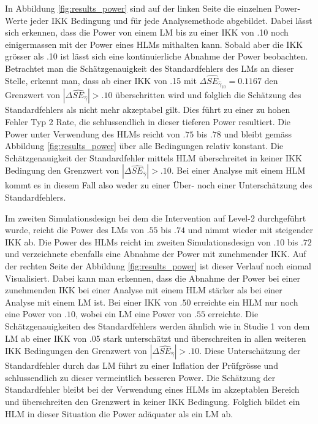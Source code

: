 \documentclass[12pt]{article}\usepackage[]{graphicx}\usepackage[]{color}
\begin{document}
In Abbildung \ref{fig:results_power} sind auf der linken Seite die einzelnen Power-Werte jeder IKK Bedingung und für jede Analysemethode abgebildet. Dabei lässt sich erkennen, dass die Power von einem LM bis zu einer IKK von .10 noch einigermassen mit der Power eines HLMs mithalten kann. Sobald aber die IKK grösser als .10 ist lässt sich eine kontinuierliche Abnahme der Power beobachten. Betrachtet man die Schätzgenauigkeit des Standardfehlers des LMs an dieser Stelle, erkennt man, dass ab einer IKK von .15 mit $\Delta\widehat{SE}_{\widehat{\gamma}_{10}} = 0.1167$ den Grenzwert von $|\Delta\widehat{SE}_{\widehat{\gamma}}| > .10$ \citep{hooglandboosma1998robustness} überschritten wird und folglich die Schätzung des Standardfehlers als nicht mehr akzeptabel gilt. Dies führt zu einer zu hohen Fehler Typ 2 Rate, die schlussendlich  in dieser tieferen Power resultiert. Die Power unter Verwendung des HLMs reicht von $.75$ bis $.78$ und bleibt gemäss Abbildung \ref{fig:results_power} über alle Bedingungen relativ konstant. Die Schätzgenauigkeit der Standardfehler mittels HLM überschreitet in keiner IKK Bedingung den Grenzwert von $|\Delta\widehat{SE}_{\widehat{\gamma}}| > .10$. Bei einer Analyse mit einem HLM kommt es in diesem Fall also weder zu einer Über- noch einer Unterschätzung des Standardfehlers.

Im zweiten Simulationsdesign bei dem die Intervention auf Level-2 durchgeführt wurde, reicht die Power des LMs von $.55$ bis $.74$ und nimmt wieder mit steigender IKK ab. Die Power des HLMs reicht im zweiten Simulationsdesign von $.10$ bis $.72$ und verzeichnete ebenfalls eine Abnahme der Power mit zunehmender IKK. Auf der rechten Seite der Abbildung \ref{fig:results_power} ist dieser Verlauf noch einmal Visualisiert. Dabei kann man erkennen, dass die Abnahme der Power bei einer zunehmenden IKK bei einer Analyse mit einem HLM stärker als bei einer Analyse mit einem LM ist. Bei einer IKK von $.50$ erreichte ein HLM nur noch eine Power von $.10$, wobei ein LM eine Power von $.55$ erreichte. Die Schätzgenauigkeiten des Standardfehlers werden ähnlich wie in Studie 1 von dem LM ab einer IKK von .05 stark unterschätzt und überschreiten in allen weiteren IKK Bedingungen den Grenzwert von $|\Delta\widehat{SE}_{\widehat{\gamma}}| > .10$. Diese Unterschätzung der Standardfehler durch das LM führt zu einer Inflation der Prüfgrösse und schlussendlich zu dieser vermeintlich besseren Power. Die Schätzung der Standardfehler bleibt bei der Verwendung eines HLMs im akzeptablen Bereich und überschreiten den Grenzwert in keiner IKK Bedingung. Folglich bildet ein HLM in dieser Situation die Power adäquater als ein LM ab.
\end{document}
